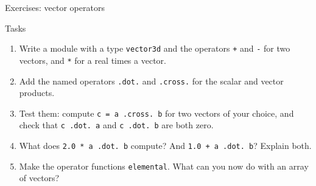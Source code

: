\begin{frame}{Exercises: vector operators}
  \begin{block}{Tasks}
    \begin{enumerate}
      \item Write a module with a type \texttt{vector3d} and the operators \texttt{+} and \texttt{-} for two vectors, and \texttt{*} for a real times a vector.
      \item Add the named operators \texttt{.dot.} and \texttt{.cross.} for the scalar and vector products.
      \item Test them: compute \mbox{\texttt{c = a .cross. b}} for two vectors of your choice, and check that \mbox{\texttt{c .dot. a}} and \mbox{\texttt{c .dot. b}} are both zero.
      \item What does \mbox{\texttt{2.0 * a .dot. b}} compute? And \mbox{\texttt{1.0 + a .dot. b}}? Explain both.
      \item Make the operator functions \texttt{elemental}. What can you now do with an array of vectors?
    \end{enumerate}
  \end{block}
\end{frame}



